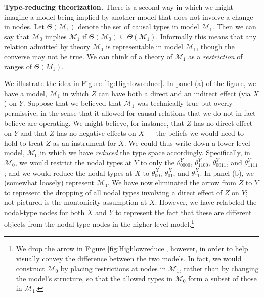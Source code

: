 \documentclass[
  12pt,
]{book}
\begin{document}
\textbf{Type-reducing theorization.} There is a second way in which we might imagine a model being implied by another model that does not involve a change in nodes. Let \(\Theta(\mathcal M_1)\) denote the set of causal types in model \(\mathcal M_1\). Then we can say that \(\mathcal M_0\) implies \(\mathcal M_1\) if \(\Theta(\mathcal M_0)\subseteq \Theta(\mathcal M_1)\). Informally this means that any relation admitted by theory \(\mathcal M_0\) is representable in model \(\mathcal M_1\), though the converse may not be true. We can think of a theory of \(\mathcal M_1\) as a \emph{restriction} of ranges of \(\Theta(M_1)\).

We illustrate the idea in Figure \ref{fig:Highlowreduce}. In panel (a) of the figure, we have a model, \(\mathcal M_1\) in which \(Z\) can have both a direct and an indirect effect (via \(X\)) on \(Y\). Suppose that we believed that \(\mathcal M_1\) was technically true but overly permissive, in the sense that it allowed for causal relations that we do not in fact believe are operating. We might believe, for instance, that \(Z\) has no direct effect on \(Y\) and that \(Z\) has no negative effects on \(X\) --- the beliefs we would need to hold to treat \(Z\) as an instrument for \(X\). We could thus write down a lower-level model, \(\mathcal M_0\),in which we have \emph{reduced} the type space accordingly. Specifically, in \(\mathcal M_0\), we would restrict the nodal types at \(Y\) to only the \(\theta^Y_{0000}\), \(\theta^Y_{1100}\), \(\theta^Y_{0011}\), and \(\theta^Y_{1111}\); and we would reduce the nodal types at \(X\) to \(\theta^X_{00}\), \(\theta^X_{01}\), and \(\theta^X_{11}\). In panel (b), we (somewhat loosely) represent \(\mathcal M_0\). We have now eliminated the arrow from \(Z\) to \(Y\) to represent the dropping of all nodal types involving a direct effect of \(Z\) on \(Y\); not pictured is the montonicity assumption at \(X\). However, we have relabeled the nodal-type nodes for both \(X\) and \(Y\) to represent the fact that these are different objects from the nodal type nodes in the higher-level model.\footnote{We drop the arrow in Figure \ref{fig:Highlowreduce}, however, in order to help visually convey the difference between the two models. In fact, we would construct \(\mathcal M_0\) by placing restrictions at nodes in \(\mathcal M_1\), rather than by changing the model's structure, so that the allowed types in \(\mathcal M_0\) form a subset of those in \(\mathcal M_1\).}
\end{document}
